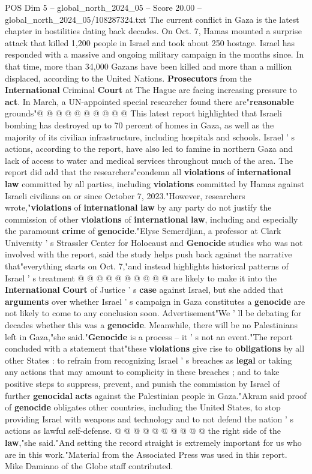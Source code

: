 \begin{textsample}{POS Dim 5 – global\_north\_2024\_05 – Score 20.00 – global\_north\_2024\_05/108287324.txt}
The current conflict in Gaza is the latest chapter in hostilities dating back decades.
On Oct. 7, Hamas mounted a surprise attack that killed 1,200 people in Israel and took about 250 hostage.
Israel has responded with a massive and ongoing military campaign in the months since.
In that time, more than 34,000 Gazans have been killed and more than a million displaced, according to the United Nations. \textbf{Prosecutors} from the \textbf{International} Criminal \textbf{Court} at The Hague are facing increasing pressure to \textbf{act}.
In March, a UN-appointed special researcher found there are"\textbf{reasonable} grounds"@ @ @ @ @ @ @ @ @ @ This latest report highlighted that Israeli bombing has destroyed up to 70 percent of homes in Gaza, as well as the majority of its civilian infrastructure, including hospitals and schools.
Israel ' s actions, according to the report, have also led to famine in northern Gaza and lack of access to water and medical services throughout much of the area.
The report did add that the researchers"condemn all \textbf{violations} of \textbf{international} \textbf{law} committed by all parties, including \textbf{violations} committed by Hamas against Israeli civilians on or since October 7, 2023."However, researchers wrote,"\textbf{violations} of \textbf{international} \textbf{law} by any party do not justify the commission of other \textbf{violations} of \textbf{international} \textbf{law}, including and especially the paramount \textbf{crime} of \textbf{genocide}."Elyse Semerdjian, a professor at Clark University ' s Strassler Center for Holocaust and \textbf{Genocide} studies who was not involved with the report, said the study helps push back against the narrative that"everything starts on Oct. 7,"and instead highlights historical patterns of Israel ' s treatment @ @ @ @ @ @ @ @ @ @ are likely to make it into the \textbf{International} \textbf{Court} of Justice ' s \textbf{case} against Israel, but she added that \textbf{arguments} over whether Israel ' s campaign in Gaza constitutes a \textbf{genocide} are not likely to come to any conclusion soon.
Advertisement"We ' ll be debating for decades whether this was a \textbf{genocide}.
Meanwhile, there will be no Palestinians left in Gaza,"she said."\textbf{Genocide} is a process -- it ' s not an event."The report concluded with a statement that"these \textbf{violations} give rise to \textbf{obligations} by all other States : to refrain from recognizing Israel ' s breaches as \textbf{legal} or taking any actions that may amount to complicity in these breaches ; and to take positive steps to suppress, prevent, and punish the commission by Israel of further \textbf{genocidal} \textbf{acts} against the Palestinian people in Gaza."Akram said proof of \textbf{genocide} obligates other countries, including the United States, to stop providing Israel with weapons and technology and to not defend the nation ' s actions as lawful self-defense. @ @ @ @ @ @ @ @ @ @ the right side of the \textbf{law},"she said."And setting the record straight is extremely important for us who are in this work."Material from the Associated Press was used in this report.
Mike Damiano of the Globe staff contributed.


\end{textsample}
